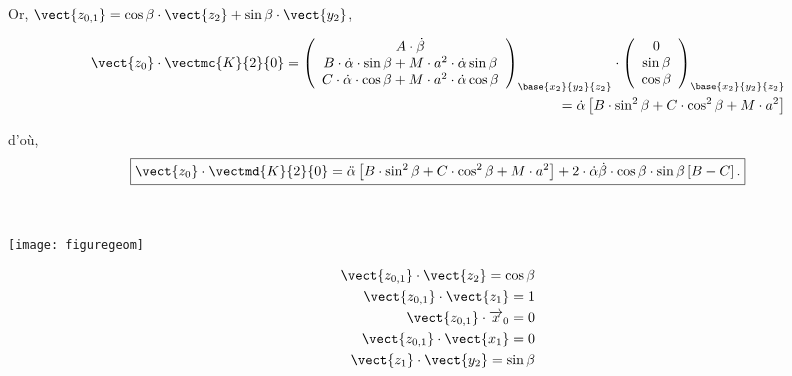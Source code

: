 \begin{multicols}{2}
\begin{corrige}
Or, $\vect{z_{0,1}}=\cos\beta\cdot \vect{z_2}+\sin\beta\cdot \vect{y_{2}}$,

\begin{align*}
\vect{z_0}\cdot\vectmc{K}{2}{0}=
\left(
\begin{array}{c}
A\cdot \dot{\beta}\\
B\cdot \dot{\alpha}\cdot \sin\beta+M\cdot a^2\cdot \dot{\alpha}\sin\beta\\
C\cdot \dot{\alpha}\cdot \cos\beta+M\cdot a^2\cdot \dot{\alpha}\cos\beta\\
\end{array}
\right)_{\base{{x}_2}{{y}_2}{{z}_2}}
\cdot
\left(
\begin{array}{c}
0\\
\sin\beta\\
\cos\beta\\
\end{array}
\right)_{\base{{x}_2}{{y}_2}{{z}_2}}
\\
=\dot{\alpha}\left[B\cdot \sin^2\beta+C\cdot \cos^2\beta+M\cdot a^2\right]
\end{align*}

d'où,
\begin{align*}
\boxed{
\vect{z_0}\cdot \vectmd{K}{2}{0}=\ddot{\alpha}\left[B\cdot \sin^2\beta+C\cdot \cos^2\beta+M\cdot a^2\right]
+2\cdot\dot{\alpha}\dot{\beta}\cdot \cos\beta\cdot \sin\beta\left[B-C\right].
}
\end{align*}
\end{corrige}
\else
\fi



\ifprof
\begin{corrige} ~\\

\begin{minipage}{0.5\textwidth}
\begin{center}
\texttt{[image: figuregeom]}
\end{center}
\end{minipage}
\begin{minipage}{0.5\textwidth}
\begin{align*}
\vect{z_{0,1}}\cdot \vect{z_2}=\cos\beta\\
\vect{z_{0,1}}\cdot \vect{z_{1}}=1\\
\vect{z_{0,1}}\cdot \overrightarrow{x}_0=0\\
\vect{z_{0,1}}\cdot \vect{x_{1}}=0\\
\vect{z_{1}}\cdot \vect{y_{2}}=\sin\beta\\
\end{align*}
\end{minipage}


\end{corrige}
\end{multicols}

